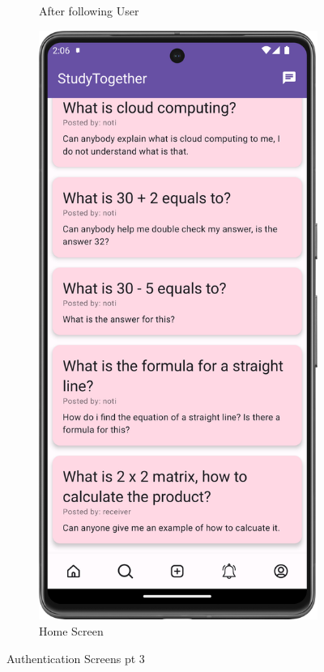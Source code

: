 \begin{figure}[H]
\begin{subfigure}[b]{0.3\textwidth}
    \caption{After following User}
    \label{fig:after_follow_user}
  \end{subfigure}
  \hfill
  \begin{subfigure}[b]{0.3\textwidth}
    \includegraphics[width=\textwidth]{Figures/Product_Images/Auth/home_screen.png}
    \caption{Home Screen}
    \label{fig:home_screen}
  \end{subfigure}
  \caption{Authentication Screens pt 3}
  \label{fig:Authentication_screens_3}
\end{figure}


